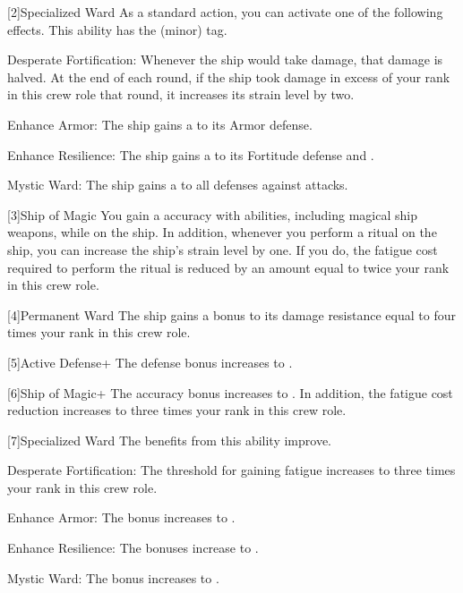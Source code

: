         [2]{Specialized Ward} As a standard action, you can activate one of the following effects.
        This ability has the  (minor) tag.
        \begin{raggeditemize}
            \item Desperate Fortification: Whenever the ship would take damage, that damage is halved.
                At the end of each round, if the ship took damage in excess of your rank in this crew role that round, it increases its strain level by two.
            \item Enhance Armor: The ship gains a   to its Armor defense.
            \item Enhance Resilience: The ship gains a   to its Fortitude defense and .
            \item Mystic Ward: The ship gains a   to all defenses against \magical attacks.
        \end{raggeditemize}

        [3]{Ship of Magic} You gain a  accuracy with \magical abilities, including magical ship weapons, while on the ship.
        In addition, whenever you perform a ritual on the ship, you can increase the ship's strain level by one.
        If you do, the fatigue cost required to perform the ritual is reduced by an amount equal to twice your rank in this crew role.

        [4]{Permanent Ward} The ship gains a bonus to its damage resistance equal to four times your rank in this crew role.

        [5]{Active Defense+} The defense bonus increases to .

        [6]{Ship of Magic+} The accuracy bonus increases to .
        In addition, the fatigue cost reduction increases to three times your rank in this crew role.

        [7]{Specialized Ward} The benefits from this ability improve.
        \begin{raggeditemize}
            \item Desperate Fortification: The threshold for gaining fatigue increases to three times your rank in this crew role.
            \item Enhance Armor: The bonus increases to .
            \item Enhance Resilience: The bonuses increase to .
            \item Mystic Ward: The bonus increases to .
        \end{raggeditemize}
